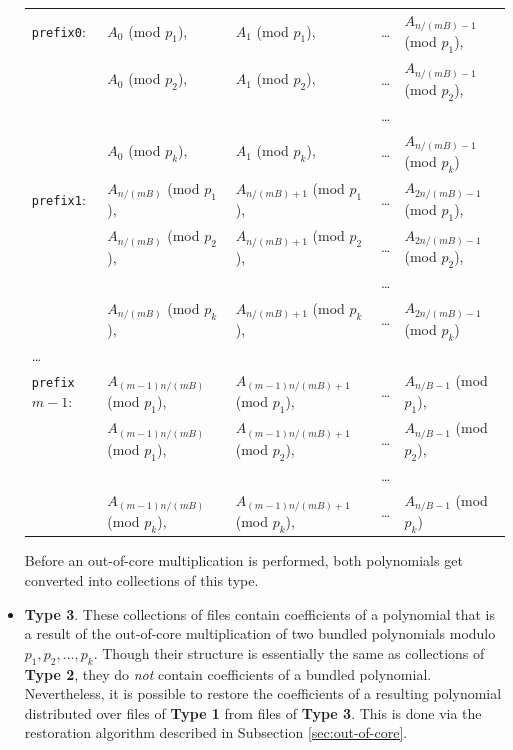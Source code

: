 \documentclass[a4paper,10pt]{article}
\begin{document}
\begin{itemize}
\begin{tabular}{l l l l l}
\texttt{prefix0}: & \textnormal{$A_0$ (mod $p_1$)}, &  \textnormal{$A_1$ (mod $p_1$)}, & \ldots & \textnormal{$A_{n/(mB) - 1}$ (mod $p_1$)},\\
& \textnormal{$A_0$ (mod $p_2$)}, &  \textnormal{$A_1$ (mod $p_2$)}, & \ldots & \textnormal{$A_{n/(mB) - 1}$ (mod $p_2$)},\\
& & & \ldots\\
& \textnormal{$A_0$ (mod $p_k$)}, &  \textnormal{$A_1$ (mod $p_k$)}, & \ldots & \textnormal{$A_{n/(mB) - 1}$ (mod $p_k$)}\\
\texttt{prefix1}: & \textnormal{$A_{n/(mB)}$ (mod $p_1$)}, &  \textnormal{$A_{n/(mB)+1}$ (mod $p_1$)}, & \ldots & \textnormal{$A_{2n/(mB) - 1}$ (mod $p_1$)},\\
& \textnormal{$A_{n/(mB)}$ (mod $p_2$)}, &  \textnormal{$A_{n/(mB)+1}$ (mod $p_2$)}, & \ldots & \textnormal{$A_{2n/(mB) - 1}$ (mod $p_2$)},\\
& & & \ldots\\
& \textnormal{$A_{n/(mB)}$ (mod $p_k$)}, &  \textnormal{$A_{n/(mB)+1}$ (mod $p_k$)}, & \ldots & \textnormal{$A_{2n/(mB) - 1}$ (mod $p_k$)}\\
\ldots\\
\texttt{prefix}$m-1$: & \textnormal{$A_{(m-1)n/(mB)}$ (mod $p_1$)}, &  \textnormal{$A_{(m-1)n/(mB)+1}$ (mod $p_1$)}, & \ldots & \textnormal{$A_{n/B - 1}$ (mod $p_1$)},\\
& \textnormal{$A_{(m-1)n/(mB)}$ (mod $p_1$)}, &  \textnormal{$A_{(m-1)n/(mB)+1}$ (mod $p_2$)}, & \ldots & \textnormal{$A_{n/B - 1}$ (mod $p_2$)},\\
& & & \ldots\\
& \textnormal{$A_{(m-1)n/(mB)}$ (mod $p_k$)}, &  \textnormal{$A_{(m-1)n/(mB)+1}$ (mod $p_k$)}, & \ldots & \textnormal{$A_{n/B - 1}$ (mod $p_k$)}
\end{tabular}

Before an out-of-core multiplication is performed, both polynomials get converted into collections of this type.

\item \textbf{Type 3}. These collections of files contain coefficients of a polynomial that is a result of the out-of-core multiplication of two bundled polynomials modulo $p_1, p_2, \ldots, p_k$. Though their structure is essentially the same as collections of \textbf{Type 2}, they do \emph{not} contain coefficients of a bundled polynomial. Nevertheless, it is possible to restore the coefficients of a resulting polynomial distributed over files of \textbf{Type 1} from files of \textbf{Type 3}. This is done via the restoration algorithm described in Subsection \ref{sec:out-of-core}.
\end{itemize}
\end{document}
